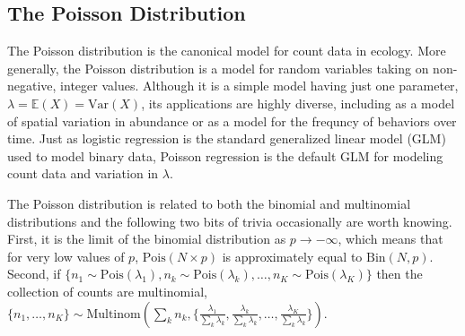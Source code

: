 \subsection{The Poisson Distribution}




The Poisson distribution is the canonical model for count data in
ecology.  More generally, the
Poisson distribution is a model for random variables taking on
non-negative, integer values.  Although it is a simple model having just one
parameter, $\lambda = \mathbb{E}(X) = \text{Var}(X)$, its applications
are highly diverse, including
as a model of spatial variation in abundance or as a model for the
frequncy of behaviors over time.  Just as logistic regression is the
standard generalized linear model (GLM) used to model binary data, Poisson
regression is the default GLM for modeling count data and variation in
$\lambda$.

The Poisson distribution is related to
both the binomial and multinomial distributions and the following two
bits of trivia occasionally are worth knowing. First, it is the limit of the binomial
distribution as $p \to -\infty$, which means that for very low values
of $p$, $\text{Pois}(N\times p)$ is approximately equal to $\text{Bin}(N,
p)$. Second, if $\{n_1 \sim \text{Pois}(\lambda_1),
n_k \sim \text{Pois}(\lambda_k),
\dots, n_K \sim \text{Pois}(\lambda_K)\}$
then the collection of counts are multinomial, $\{n_1, \dots, n_K\}
\sim \text{Multinom}(\sum_k n_k, \{\frac{\lambda_1}{\sum_k \lambda_k},
\frac{\lambda_k}{\sum_k \lambda_k},
\dots, \frac{\lambda_K}{\sum_k \lambda_k}
\})$.

